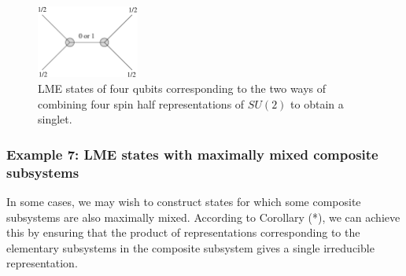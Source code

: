 \documentclass[12pt]{article}
\theoremstyle{definition}
\begin{document}
\begin{figure}
\centering
\includegraphics[width=0.3\textwidth]{qubit4simple.eps}
\caption{LME states of four qubits corresponding to the two ways of combining four spin half representations of $SU(2)$ to obtain a singlet.}
\label{qubit4simple}
\end{figure}


\subsubsection*{Example 7: LME states with maximally mixed composite subsystems}

In some cases, we may wish to construct states for which some composite subsystems are also maximally mixed. According to Corollary (*), we can achieve this by ensuring that the product of representations corresponding to the elementary subsystems in the composite subsystem gives a single irreducible representation.
\end{document}
